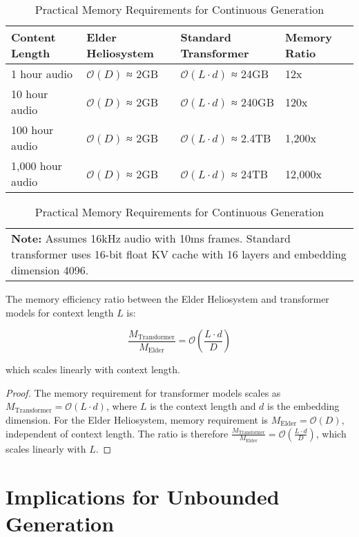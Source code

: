 \begin{table}[ht]
\centering
\caption{Practical Memory Requirements for Continuous Generation}
\begin{tabular}{|p{3cm}|p{3cm}|p{3cm}|p{3cm}|}
\hline
\textbf{Content Length} & \textbf{Elder Heliosystem} & \textbf{Standard Transformer} & \textbf{Memory Ratio} \\
\hline
1 hour audio & $\mathcal{O}(D)$ ≈ 2GB & $\mathcal{O}(L \cdot d)$ ≈ 24GB & 12x \\
\hline
10 hour audio & $\mathcal{O}(D)$ ≈ 2GB & $\mathcal{O}(L \cdot d)$ ≈ 240GB & 120x \\
\hline
100 hour audio & $\mathcal{O}(D)$ ≈ 2GB & $\mathcal{O}(L \cdot d)$ ≈ 2.4TB & 1,200x \\
\hline
1,000 hour audio & $\mathcal{O}(D)$ ≈ 2GB & $\mathcal{O}(L \cdot d)$ ≈ 24TB & 12,000x \\
\hline
\end{tabular}

\begin{tabular}{p{15cm}}
\textbf{Note:} Assumes 16kHz audio with 10ms frames. Standard transformer uses 16-bit float KV cache with 16 layers and embedding dimension 4096.
\end{tabular}
\end{table}

\begin{theorem}
The memory efficiency ratio between the Elder Heliosystem and transformer models for context length $L$ is:

\begin{equation}
\frac{M_{\text{Transformer}}}{M_{\text{Elder}}} = \mathcal{O}\left(\frac{L \cdot d}{D}\right)
\end{equation}

which scales linearly with context length.
\end{theorem}

\begin{proof}
The memory requirement for transformer models scales as $M_{\text{Transformer}} = \mathcal{O}(L \cdot d)$, where $L$ is the context length and $d$ is the embedding dimension. For the Elder Heliosystem, memory requirement is $M_{\text{Elder}} = \mathcal{O}(D)$, independent of context length. The ratio is therefore $\frac{M_{\text{Transformer}}}{M_{\text{Elder}}} = \mathcal{O}\left(\frac{L \cdot d}{D}\right)$, which scales linearly with $L$.
\end{proof}

\section{Implications for Unbounded Generation}

